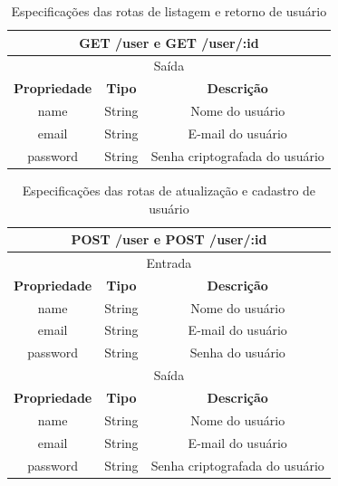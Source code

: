 \begin{table}[H]
    \centering
    \caption{Especificações das rotas de listagem e retorno de usuário}
    \begin{tabular}{c|c|c}
    \hline
    \multicolumn{3}{c}{\textbf{GET /user e GET /user/:id}} \\ \hline
    \multicolumn{3}{c}{Saída}                                                          \\ \hline
    \textbf{Propriedade}         & \textbf{Tipo}         & \textbf{Descrição}            \\  \hline
    name                         & String                & Nome do usuário               \\  \hline
    email                        & String                & E-mail do usuário \\
    \hline
    password                     & String                & Senha criptografada do usuário \\
    \hline
    \end{tabular}
\end{table}

\begin{table}[H]
    \centering
    \caption{Especificações das rotas de atualização e cadastro de usuário}
    \begin{tabular}{c|c|c}
    \hline
    \multicolumn{3}{c}{\textbf{POST /user e POST /user/:id}} \\ \hline
    \multicolumn{3}{c}{Entrada}                                                        \\ \hline
    \textbf{Propriedade}         & \textbf{Tipo}         & \textbf{Descrição}            \\  \hline
    name                         & String                & Nome do usuário               \\  \hline
    email                        & String                & E-mail do usuário \\
    \hline
    password                     & String                & Senha do usuário \\

    \hline

    \multicolumn{3}{c}{Saída}                                                        \\ \hline
    \textbf{Propriedade}         & \textbf{Tipo}         & \textbf{Descrição}            \\  \hline
    name                         & String                & Nome do usuário               \\  \hline
    email                        & String                & E-mail do usuário \\
    \hline
    password                     & String                & Senha criptografada do usuário \\

    \hline
    \end{tabular}
\end{table}

